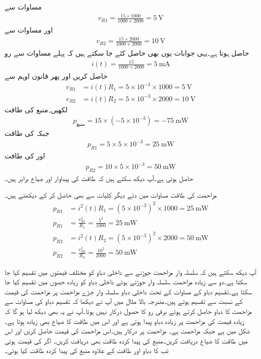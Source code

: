 مساوات  سے
\begin{align*}
v_{R1}=\frac{15 \times 1000}{1000+2000}=\SI{5}{\volt} 
\end{align*}
اور مساوات  سے
\begin{align*}
v_{R2}=\frac{15 \times 2000}{1000+2000}=\SI{10}{\volt} 
\end{align*}
حاصل ہوتا ہے۔یہی جوابات یوں بھی حاصل کئے جا سکتے ہیں کہ پہلے مساوات  سے رو
\begin{align*}
i(t)=\frac{15}{1000+2000}=\SI{5}{\milli\ampere}
\end{align*}
حاصل کریں اور پھر قانون اوہم سے
\begin{align*}
v_{R1}&=i(t) R_1 =5 \times 10^{-3} \times 1000=\SI{5}{\volt}\\
v_{R2}&=i(t) R_2 =5 \times 10^{-3} \times 2000=\SI{10}{\volt}
\end{align*}
لکھیں۔منبع کی طاقت
\begin{align*}
p_{\text{منبع}}=15 \times (-5\times 10^{-3})=\SI{-75}{\milli\watt}
\end{align*}
جبکہ  کی طاقت
\begin{align*}
p_{R1}=5\times 5\times 10^{-3}= \SI{25}{\milli\watt}
\end{align*}
اور  کی طاقت
\begin{align*}
p_{R2}=10\times 5\times 10^{-3}= \SI{50}{\milli\watt}
\end{align*}
حاصل ہوتی ہے۔آپ دیکھ سکتے ہیں کہ طاقت کی پیداوار اور ضیاع برابر ہیں۔

مزاحمت کی طاقت مساوات   میں دئے دیگر کلیات سے بھی حاصل کر کے دیکھتے ہیں۔
\begin{align*}
p_{R1}&=i^2(t) R_1=(5\times 10^{-3})^2 \times 1000=\SI{25}{\milli\watt}\\
p_{R1}&=\frac{v^2_{R1}}{R_1}=\frac{5^2}{1000}=\SI{25}{\milli\watt}\\
p_{R2}&=i^2(t) R_2=(5\times 10^{-3})^2 \times 2000=\SI{50}{\milli\watt}\\
p_{R2}&=\frac{v^2_{R2}}{R_2}=\frac{10^2}{2000}=\SI{50}{\milli\watt}
\end{align*}

آپ دیکھ سکتے ہیں کہ سلسلہ وار مزاحمت جوڑنے سے داخلی دباو کو مختلف قیمتوں میں تقسیم کیا جا سکتا ہے۔دو سے زیادہ مزاحمت سلسلہ وار جوڑتے ہوئے داخلی دباو کو زیادہ حصوں میں تقسیم کیا جا سکتا ہے۔تقسیم دباو کے مساوات کے تحت داخلی دباو سلسلہ وار جڑے مزاحمت پر مزاحمت کی قیمت کے نسبت سے تقسیم ہوتے ہیں۔مندرجہ بالا مثال میں آپ نے دیکھا کہ تقسیم دباو کی مساوات سے مزاحمت کا دباو حاصل کرتے ہوئے  برقی رو  کا حصول درکار نہیں ہوتا۔آپ نے یہ بھی دیکھ لیا ہو گا کہ زیادہ قیمت کی مزاحمت پر زیادہ دباو پیدا ہوتی ہے اور اس میں طاقت کا ضیاع بھی زیادہ ہوتا ہے۔
شکل  میں  ہے جبکہ مزاحمت  ہے۔ مزاحمت  پر  درکار ہیں۔اس مزاحمت کی قیمت حاصل کریں اور اس میں طاقت کا ضیاع دریافت کریں۔منبع کی پیدا کردہ طاقت بھی دریافت کریں۔ اگر  کی قیمت  ہوتی تب  کا دباو اور  طاقت کے علاوہ منبع کی پیدا کردہ طاقت کیا ہوتی۔


